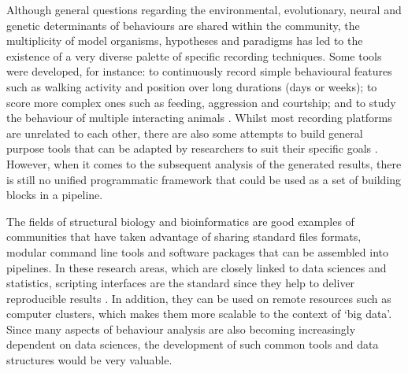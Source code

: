 \documentclass[10pt,letterpaper]{article}\usepackage[]{graphicx}\usepackage[]{color}
\begin{document}

%

Although general questions regarding the environmental, evolutionary, neural and genetic determinants of behaviours are shared within the community,
the multiplicity of model organisms, hypotheses and paradigms has led to the existence of a very diverse palette of specific recording techniques.
Some tools were developed, for instance:
to continuously record simple behavioural features such as walking activity\cite{faville_how_2015} and  position\cite{pelkowski_novel_2011} over long durations (days or weeks);
to score more complex ones such as feeding\cite{itskov_automated_2014,ro_flic_2014}, aggression\cite{dankert_automated_2009} and courtship\cite{tsai_image_2012};
and to study the behaviour of multiple interacting animals \cite{swierczek_high-throughput_2011,perez-escudero_idtracker_2014,robie_mapping_2017}.
Whilst most recording platforms are unrelated to each other, there are also some attempts to build general purpose tools that can be adapted by researchers to
suit their specific goals \cite{branson_high-throughput_2009,kabra_jaaba_2013,lopes_bonsai_2015,geissmann_ethoscopes_2017}.
However, when it comes to the subsequent analysis of the generated results, there is still no unified programmatic framework that could be used as a set of building blocks in a pipeline.


The fields of structural biology and  bioinformatics are good examples of communities that have taken advantage of sharing standard files formats, modular command line tools\cite{roumpeka_review_2017} and software packages\cite{huber_orchestrating_2015} that can be assembled into pipelines\cite{leipzig_review_2017}.
In these research areas, which are closely linked to data sciences and statistics, scripting interfaces are the standard since they help to deliver reproducible results \cite{peng_reproducible_2011,stodden_toward_2013}.
In addition, they can be used on remote resources such as computer clusters, which makes them more scalable to the context of `big data'\cite{hashem_rise_2015}.
Since many aspects of behaviour analysis are also becoming increasingly dependent on data sciences, the development of such common tools and data structures would be very valuable.
\end{document}
